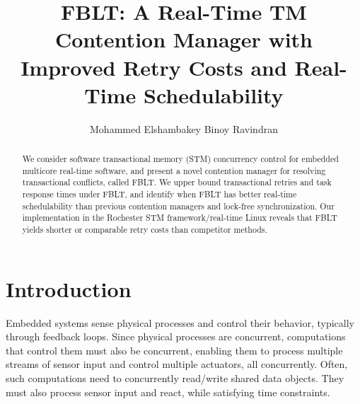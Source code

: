 \documentclass[prodmode,acmtecs]{acmsmall}
\begin{document}

\title{FBLT: A Real-Time TM Contention Manager with Improved Retry Costs and Real-Time Schedulability}

\author{Mohammed Elshambakey
Binoy Ravindran
}


\begin{abstract}
We consider software transactional memory (STM) concurrency control for embedded multicore real-time software, and present a novel contention manager for resolving transactional conflicts, called FBLT. We upper bound transactional retries and task response times under FBLT, and identify when FBLT has better real-time schedulability than previous contention managers and lock-free synchronization. Our implementation in the Rochester STM framework/real-time Linux reveals that FBLT yields shorter or comparable retry costs than competitor methods.
\end{abstract}





\begin{comment}
\begin{bottomstuff}
New Paper, Not an Extension of a Conference Paper.\\
Author's addresses: M. Elshambakey {and} B. Ravindran, ECE Department,
Virginia Tech University, Blacksburg, VA 24060, USA.
\end{bottomstuff}
\end{comment}

\maketitle


\section{Introduction}

\label{sec:intro}

Embedded systems sense physical processes and control their behavior, typically through feedback loops. Since physical processes are concurrent, computations that control them must also be concurrent, enabling them to process multiple streams of sensor input and control multiple actuators, all concurrently. Often, such computations need to concurrently read/write shared data objects. They must also process sensor input and react, while satisfying time constraints. 
\end{document}
